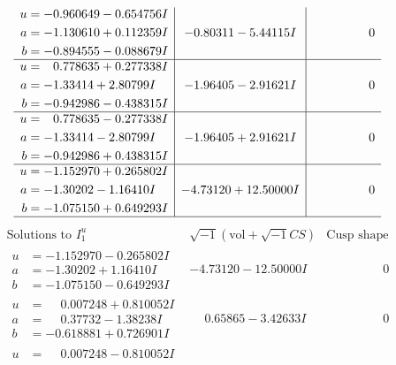 \documentclass[1p]{elsarticle_modified}
\theoremstyle{definition}
\newcommand{\I}{\sqrt{-1}}
\begin{document}
$$\begin{array}{c|c|c}
\begin{aligned}
u &= -0.960649 - 0.654756 I \\
a &= -1.130610 + 0.112359 I \\
b &= -0.894555 - 0.088679 I\end{aligned}
 & -0.80311 - 5.44115 I & \phantom{-0.000000 } 0 \\ \hline\begin{aligned}
u &= \phantom{-}0.778635 + 0.277338 I \\
a &= -1.33414 + 2.80799 I \\
b &= -0.942986 - 0.438315 I\end{aligned}
 & -1.96405 - 2.91621 I & \phantom{-0.000000 } 0 \\ \hline\begin{aligned}
u &= \phantom{-}0.778635 - 0.277338 I \\
a &= -1.33414 - 2.80799 I \\
b &= -0.942986 + 0.438315 I\end{aligned}
 & -1.96405 + 2.91621 I & \phantom{-0.000000 } 0 \\ \hline\begin{aligned}
u &= -1.152970 + 0.265802 I \\
a &= -1.30202 - 1.16410 I \\
b &= -1.075150 + 0.649293 I\end{aligned}
 & -4.73120 + 12.50000 I & \phantom{-0.000000 } 0\\
 \hline 
 \end{array}$$\newpage$$\begin{array}{c|c|c}  
\text{Solutions to }I^u_{1}& \I (\text{vol} + \sqrt{-1}CS) & \text{Cusp shape}\\
 \hline 
\begin{aligned}
u &= -1.152970 - 0.265802 I \\
a &= -1.30202 + 1.16410 I \\
b &= -1.075150 - 0.649293 I\end{aligned}
 & -4.73120 - 12.50000 I & \phantom{-0.000000 } 0 \\ \hline\begin{aligned}
u &= \phantom{-}0.007248 + 0.810052 I \\
a &= \phantom{-}0.37732 - 1.38238 I \\
b &= -0.618881 + 0.726901 I\end{aligned}
 & \phantom{-}0.65865 - 3.42633 I & \phantom{-0.000000 } 0 \\ \hline\begin{aligned}
u &= \phantom{-}0.007248 - 0.810052 I \\

\end{aligned}
\end{array}$$
\end{document}

